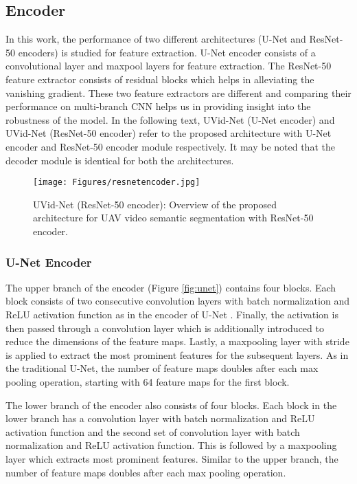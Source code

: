 \documentclass[journal]{IEEEtran}
\begin{document}
\subsection{Encoder}  
\label{SubSec:Encoder}
\par  In this work, the performance of two different architectures (U-Net and ResNet-50 encoders) is studied for feature extraction. U-Net encoder consists of a convolutional layer and maxpool layers for feature extraction. The ResNet-50 feature extractor consists of residual blocks which helps in alleviating the vanishing gradient. These two feature extractors are different and comparing their performance on multi-branch CNN helps us in providing insight into the robustness of the model. In the following text, UVid-Net (U-Net encoder) and UVid-Net (ResNet-50 encoder) refer to the proposed architecture with U-Net encoder and ResNet-50 encoder module respectively. It may be noted that the decoder module is identical for both the architectures. 


\begin{figure}[t]
	\begin{center}
		\texttt{[image: Figures/resnetencoder.jpg]}
\end{center}
	\caption{UVid-Net (ResNet-50 encoder): Overview of the proposed architecture for UAV video semantic segmentation with ResNet-50 encoder.}
	\label{fig:res}
\end{figure} 

\subsubsection{U-Net Encoder} 
\par The upper branch of the encoder (Figure \ref{fig:unet}) contains four blocks. Each block consists of two consecutive  convolution layers with batch normalization and ReLU activation function as in the encoder of U-Net \cite{26}. Finally, the activation is then passed through a  convolution layer which is additionally introduced to reduce the dimensions of the feature maps. Lastly, a maxpooling layer with stride  is applied to extract the most prominent features for the subsequent layers. As in the traditional U-Net, the number of feature maps doubles after each max pooling operation, starting with 64 feature maps for the first block.  



The lower branch of the encoder also consists of four blocks. Each block in the lower branch has a  convolution layer with batch normalization and ReLU activation function and the second set of  convolution layer with batch normalization and ReLU activation function. This is followed by a maxpooling layer which extracts most prominent features.  Similar to the upper branch, the number of feature maps doubles after each max pooling operation. 
\end{document}
